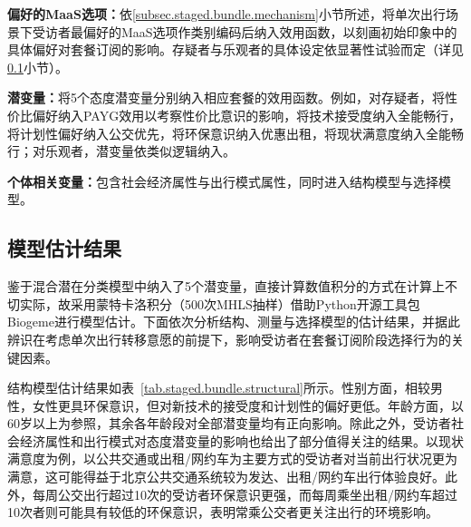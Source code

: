 \textbf{偏好的MaaS选项：}依\ref{subsec.staged.bundle.mechanism}小节所述，将单次出行场景下受访者最偏好的MaaS选项作类别编码后纳入效用函数，以刻画初始印象中的具体偏好对套餐订阅的影响。存疑者与乐观者的具体设定依显著性试验而定（详见\ref{subsec.staged.bundle.result}小节）。

\textbf{潜变量：}将5个态度潜变量分别纳入相应套餐的效用函数。例如，对存疑者，将性价比偏好纳入PAYG效用以考察性价比意识的影响，将技术接受度纳入全能畅行，将计划性偏好纳入公交优先，将环保意识纳入优惠出租，将现状满意度纳入全能畅行；对乐观者，潜变量依类似逻辑纳入。

\textbf{个体相关变量：}包含社会经济属性与出行模式属性，同时进入结构模型与选择模型。

\subsection{模型估计结果}\label{subsec.staged.bundle.result}

鉴于混合潜在分类模型中纳入了5个潜变量，直接计算数值积分的方式在计算上不切实际，故采用蒙特卡洛积分（500次MHLS抽样）借助Python开源工具包Biogeme进行模型估计\citep{kimHybridChoiceModels2014,bierlairePythonBiogemeShortIntroduction2016}。下面依次分析结构、测量与选择模型的估计结果，并据此辨识在考虑单次出行转移意愿的前提下，影响受访者在套餐订阅阶段选择行为的关键因素。

结构模型估计结果如表~\ref{tab.staged.bundle.structural}所示。性别方面，相较男性，女性更具环保意识\citep{echavarrenGenderGapEnvironmental2023}，但对新技术的接受度和计划性的偏好更低\citep{kimInfluenceLatentLifestyle2022}。年龄方面，以60岁以上为参照，其余各年龄段对全部潜变量均有正向影响。除此之外，受访者社会经济属性和出行模式对态度潜变量的影响也给出了部分值得关注的结果。以现状满意度为例，以公共交通或出租/网约车为主要方式的受访者对当前出行状况更为满意，这可能得益于北京公共交通系统较为发达、出租/网约车出行体验良好。此外，每周公交出行超过10次的受访者环保意识更强，而每周乘坐出租/网约车超过10次者则可能具有较低的环保意识，表明常乘公交者更关注出行的环境影响。

